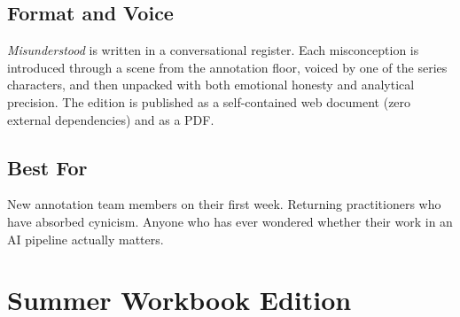 \documentclass[12pt, a4paper]{article}
\begin{document}
\begin{tcolorbox}[editionbox=autumnred, title=Autumn Edition \textbullet\ Practitioner Pamphlet]
\subsection*{\color{charcoal} Format and Voice}

\textit{Misunderstood} is written in a conversational register. Each misconception is introduced through a scene from the annotation floor, voiced by one of the series characters, and then unpacked with both emotional honesty and analytical precision. The edition is published as a self-contained web document (zero external dependencies) and as a PDF.

\subsection*{\color{charcoal} Best For}

New annotation team members on their first week. Returning practitioners who have absorbed cynicism. Anyone who has ever wondered whether their work in an AI pipeline actually matters.

\end{tcolorbox}

\newpage

\section{Summer Workbook Edition}
\end{document}
